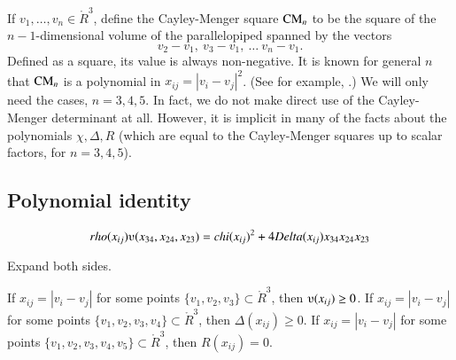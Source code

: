 \begin{tarskidata}
\begin{tarski}
If $v_1,\ldots,v_n\in\ring{R}^3$, define
the Cayley-Menger square ${\operatorname{CM}}_n$
to be the square
of the $n-1$-dimensional volume of the parallelopiped spanned by the
vectors
	$$v_2-v_1,\ v_3-v_1,\ \ldots\ v_n-v_1.$$
Defined as a square, its value is always non-negative.
It is known for general $n$ that ${\operatorname{CM}}_n$ is a polynomial in
$x_{ij} = |v_i-v_j|^2$.  (See for example,
\cite{EZ}.)
We will only need the cases, $n=3,4,5$.
In fact, we do not make direct use of the Cayley-Menger determinant at all.  However,
it is implicit in many of the facts about the polynomials $\chi,\Delta,R$ (which
are equal to the Cayley-Menger squares up to scalar factors, for $n=3,4,5$). 
\end{tarski}



\begin{tarski}
\section{Polynomial identity}


\begin{lemma}
  $$\rho(x_{ij}) \ups(x_{34},x_{24},x_{23}) = \chi(x_{ij})^2 +
  4 \Delta(x_{ij}) x_{34} x_{24} x_{23}$$
\end{lemma}

\begin{proved} Expand both sides.
\swallowed\end{proved}
\end{tarski}


\begin{tarski}

\begin{lemma}
If $x_{ij} = |v_i-v_j|$ for some points $\{v_1,v_2,v_3\}\subset\ring{R}^3$,  then
$\ups(x_{ij})\ge 0$.
If $x_{ij} = |v_i-v_j|$ for some points $\{v_1,v_2,v_3,v_4\}\subset\ring{R}^3$,  then
$\Delta(x_{ij})\ge 0$.
If $x_{ij} = |v_i-v_j|$ for some points $\{v_1,v_2,v_3,v_4,v_5\}\subset\ring{R}^3$,  then
$R(x_{ij})= 0$.
\end{lemma}


\end{tarski}
\end{tarskidata}
